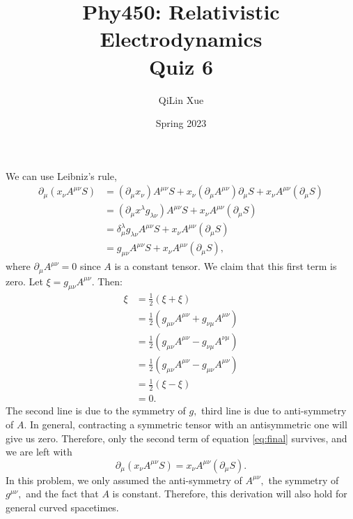 \documentclass{article}
\title{Phy450: Relativistic Electrodynamics \\ Quiz 6}
\author{QiLin Xue}
\date{Spring 2023}
\begin{document}
\maketitle
We can use Leibniz's rule,
\begin{align}
    \partial_\mu(x_\nu A^{\mu\nu} S) &= (\partial_\mu x_\nu) A^{\mu\nu}S + x_\nu (\partial_{\mu}A^{\mu\nu}) \partial_\mu S + x_\nu A^{\mu\nu}(\partial_\mu S) \\
    &= (\partial_\mu x^\lambda g_{\lambda\nu}) A^{\mu\nu}S  + x_\nu A^{\mu\nu}(\partial_\mu S) \\ 
    &= \delta^{\lambda}_{\mu} g_{\lambda\nu} A^{\mu\nu}S+ x_\nu A^{\mu\nu}(\partial_\mu S) \\ 
    &= g_{\mu\nu} A^{\mu\nu}S+ x_\nu A^{\mu\nu}(\partial_\mu S), \label{eq:final}
\end{align}
where $\partial_\mu A^{\mu\nu}=0$ since $A$ is a constant tensor. We claim that this first term is zero. Let $\xi = g_{\mu\nu} A^{\mu\nu}.$ Then:
\begin{align}
    \xi &= \frac{1}{2}(\xi+\xi) \\ 
       &= \frac{1}{2}\left(g_{\mu\nu} A^{\mu\nu} + g_{\nu\mu} A^{\mu\nu}\right) \\ 
       &= \frac{1}{2}\left(g_{\mu\nu} A^{\mu\nu} - g_{\nu\mu} A^{\nu\mu}\right) \\ 
       &= \frac{1}{2}\left(g_{\mu\nu} A^{\mu\nu} - g_{\mu\nu} A^{\mu\nu}\right) \\ 
       &= \frac{1}{2}(\xi - \xi) \\ 
       &= 0.
\end{align}
The second line is due to the symmetry of $g,$ third line is due to anti-symmetry of $A.$ In general, contracting a symmetric tensor with an antisymmetric one will give us zero. Therefore, only the second term of equation \ref{eq:final} survives, and we are left with 
\begin{equation}
    \partial_\mu(x_\nu A^{\mu\nu} S)  = x_\nu A^{\mu\nu}(\partial_\mu S).
\end{equation}
In this problem, we only assumed the anti-symmetry of $A^{\mu\nu},$ the symmetry of $g^{\mu\nu},$ and the fact that $A$ is constant. Therefore, this derivation will also hold for general curved spacetimes.
\end{document}
